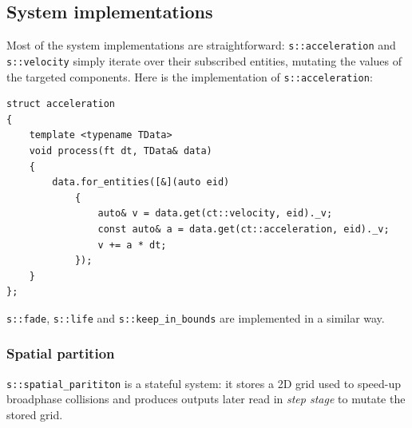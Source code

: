 \documentclass[twoside, 12pt, a4paper, openany]{book}
\begin{document}
\subsection{System implementations}\label{system-implementations}

Most of the system implementations are straightforward:
\texttt{s::acceleration}
and
\texttt{s::velocity}
simply iterate over their subscribed entities, mutating the values of
the targeted components. Here is the implementation of
\texttt{s::acceleration}:

\begin{verbatim}
struct acceleration
{
    template <typename TData>
    void process(ft dt, TData& data)
    {
        data.for_entities([&](auto eid)
            {
                auto& v = data.get(ct::velocity, eid)._v;
                const auto& a = data.get(ct::acceleration, eid)._v;
                v += a * dt;
            });
    }
};
\end{verbatim}

\texttt{s::fade},
\texttt{s::life}
and
\texttt{s::keep_in_bounds}
are implemented in a similar way.

\subsubsection{Spatial partition}\label{spatial-partition}

\texttt{s::spatial_parititon}
is a stateful system: it stores a 2D grid used to speed-up broadphase
collisions and produces outputs later read in \emph{step stage} to
mutate the stored grid.
\end{document}
